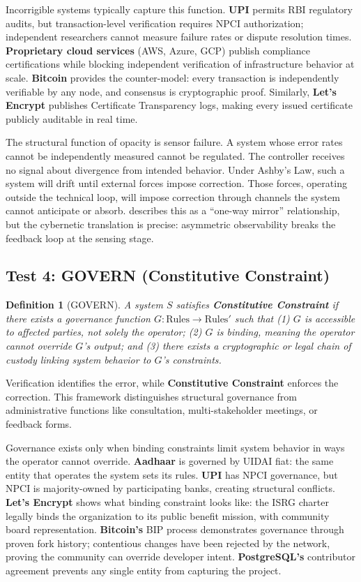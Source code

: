 \documentclass{article}
\newtheorem{definition}{Definition}
\begin{document}
Incorrigible systems typically capture this function. \textbf{UPI} permits RBI regulatory audits, but transaction-level verification requires NPCI authorization; independent researchers cannot measure failure rates or dispute resolution times. \textbf{Proprietary cloud services} (AWS, Azure, GCP) publish compliance certifications while blocking independent verification of infrastructure behavior at scale. \textbf{Bitcoin} provides the counter-model: every transaction is independently verifiable by any node, and consensus is cryptographic proof. Similarly, \textbf{Let's Encrypt} publishes Certificate Transparency logs, making every issued certificate publicly auditable in real time.

The structural function of opacity is sensor failure. A system whose error rates cannot be independently measured cannot be regulated. The controller receives no signal about divergence from intended behavior. Under Ashby's Law, such a system will drift until external forces impose correction. Those forces, operating outside the technical loop, will impose correction through channels the system cannot anticipate or absorb. \citet{pasquale2015} describes this as a ``one-way mirror'' relationship, but the cybernetic translation is precise: asymmetric observability breaks the feedback loop at the sensing stage.

\subsection{Test 4: GOVERN (Constitutive Constraint)}

\begin{definition}[GOVERN]
\label{def:govern}
A system $S$ satisfies \textbf{Constitutive Constraint} if there exists a governance function $G: \text{Rules} \to \text{Rules}'$ such that (1) $G$ is accessible to affected parties, not solely the operator; (2) $G$ is binding, meaning the operator cannot override $G$'s output; and (3) there exists a cryptographic or legal chain of custody linking system behavior to $G$'s constraints.
\end{definition}

Verification identifies the error, while \textbf{Constitutive Constraint} enforces the correction. This framework distinguishes structural governance from administrative functions like consultation, multi-stakeholder meetings, or feedback forms.

Governance exists only when binding constraints limit system behavior in ways the operator cannot override. \textbf{Aadhaar} is governed by UIDAI fiat: the same entity that operates the system sets its rules. \textbf{UPI} has NPCI governance, but NPCI is majority-owned by participating banks, creating structural conflicts. \textbf{Let's Encrypt} shows what binding constraint looks like: the ISRG charter legally binds the organization to its public benefit mission, with community board representation. \textbf{Bitcoin's} BIP process demonstrates governance through proven fork history; contentious changes have been rejected by the network, proving the community can override developer intent. \textbf{PostgreSQL's} contributor agreement prevents any single entity from capturing the project.
\end{document}
